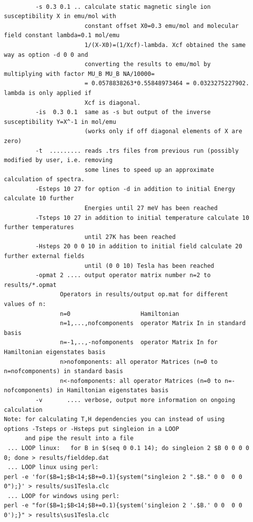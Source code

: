 \begin{description}
\begin{verbatim}

         -s 0.3 0.1 .. calculate static magnetic single ion susceptibility X in emu/mol with
                       constant offset X0=0.3 emu/mol and molecular field constant lambda=0.1 mol/emu
                       1/(X-X0)=(1/Xcf)-lambda. Xcf obtained the same way as option -d 0 0 and
                       converting the results to emu/mol by multiplying with factor MU_B MU_B NA/10000=
                       = 0.0578838263*0.55848973464 = 0.0323275227902. lambda is only applied if  
                       Xcf is diagonal.
         -is  0.3 0.1  same as -s but output of the inverse susceptibility Y=X^-1 in mol/emu
                       (works only if off diagonal elements of X are zero)
         -t  ......... reads .trs files from previous run (possibly modified by user, i.e. removing
                       some lines to speed up an approximate calculation of spectra.
         -Esteps 10 27 for option -d in addition to initial Energy calculate 10 further
                       Energies until 27 meV has been reached
         -Tsteps 10 27 in addition to initial temperature calculate 10 further temperatures
                       until 27K has been reached
         -Hsteps 20 0 0 10 in addition to initial field calculate 20 further external fields
                       until (0 0 10) Tesla has been reached
         -opmat 2 .... output operator matrix number n=2 to results/*.opmat
                Operators in results/output op.mat for different values of n:
                n=0                    Hamiltonian
                n=1,...,nofcomponents  operator Matrix In in standard basis
                n=-1,..,-nofomponents  operator Matrix In for Hamiltonian eigenstates basis
                n>nofomponents: all operator Matrices (n=0 to n=nofcomponents) in standard basis
                n<-nofomponents: all operator Matrices (n=0 to n=-nofcomponents) in Hamiltonian eigenstates basis
         -v       .... verbose, output more information on ongoing calculation
Note: for calculating T,H dependencies you can instead of using options -Tsteps or -Hsteps put singleion in a LOOP
      and pipe the result into a file
 ... LOOP linux:   for B in $(seq 0 0.1 14); do singleion 2 $B 0 0 0 0 0; done > results/fielddep.dat
 ... LOOP linux using perl:
perl -e 'for($B=1;$B<14;$B+=0.1){system("singleion 2 ".$B." 0 0  0 0 0");}' > results/sus1Tesla.clc 
 ... LOOP for windows using perl:
perl -e "for($B=1;$B<14;$B+=0.1){system('singleion 2 '.$B.' 0 0  0 0 0');}" > results\sus1Tesla.clc


\end{verbatim}
\end{description}
